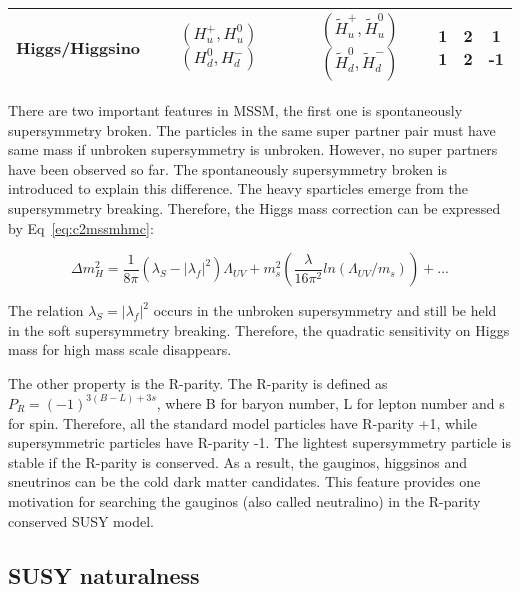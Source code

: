 \begin{table}[htbp]
\begin{centering}
\begin{tabular}{|c|c|c|c|c|c|}
\hline
Higgs/Higgsino   & \specialcell{$(H_{u}^{+},H_{u}^{0})$ \\ $(H_{d}^{0},H_{d}^{-})$} & \specialcell{$(\tilde{H}_{u}^{+},\tilde{H}_{u}^{0})$ \\ $(\tilde{H}_{d}^{0},\tilde{H}_{d}^{-})$} & \specialcell{1 \\ 1} & \specialcell{2 \\ 2} & \specialcell{1 \\ -1} \\
\hline
\end{tabular}
\par\end{centering}
\end{table}

There are two important features in MSSM, the first one is spontaneously supersymmetry broken. The particles in the same super partner pair must have same mass if unbroken supersymmetry is unbroken. However, no super partners have been observed so far. The spontaneously supersymmetry broken is introduced to explain this difference. The heavy sparticles emerge from the supersymmetry breaking. Therefore, the Higgs mass correction can be expressed by Eq~\ref{eq:c2mssmhmc}:

\begin{equation}
 \Delta m_{H}^{2} = \frac{1}{8\pi}(\lambda_{S}-|\lambda_{f}|^{2})\Lambda_{UV}+m_{s}^{2}(\frac{\lambda}{16\pi^{2}}ln(\Lambda_{UV}/m_{s}))+...
 \label{eq:c2mssmhmc}
\end{equation}

The relation $\lambda_{S}=|\lambda_{f}|^{2}$ occurs in the unbroken supersymmetry and still be held in the soft supersymmetry breaking\cite{Martin:1997ns}. Therefore, the quadratic sensitivity on Higgs mass for high mass scale disappears.

The other property is the R-parity. The R-parity is defined as $P_{R}=(-1)^{3(B-L)+3s}$, where B for baryon number, L for lepton number and s for spin. Therefore, all the standard model particles have R-parity +1, while supersymmetric particles have R-parity -1. The lightest supersymmetry particle is stable if the R-parity is conserved. As a result, the gauginos, higgsinos and sneutrinos can be the cold dark matter candidates. This feature provides one motivation for searching the gauginos (also called neutralino) in the R-parity conserved SUSY model. 

\clearpage
\subsection{SUSY naturalness}


